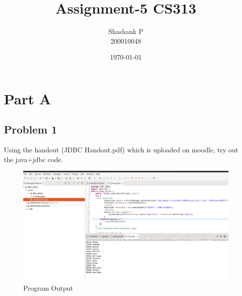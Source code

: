 \documentclass{article}
\title{Assignment-5 CS313}
\author{Shashank P \\ 200010048}
\date{\today}
\begin{document}
\maketitle




\section{Part A}
\subsection{Problem 1}
Using the handout (JDBC Handout.pdf) which is uploaded on moodle, try out the
java+jdbc code.
\begin{figure}[!ht]
  \begin{center}
  \includegraphics[scale=0.5]{Part_A_1.png}
  \caption{Program Output}
  \end{center}
\end{figure}

\newpage
\end{document}
